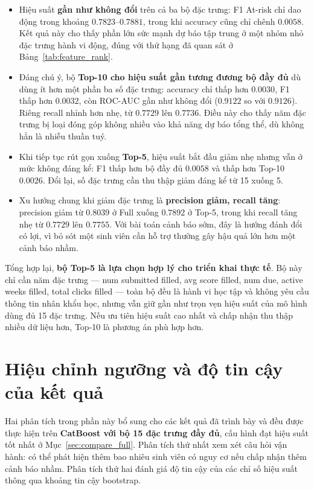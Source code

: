 \documentclass[a4paper]{report}
\newcommand{\code}[1]{{\ttfamily\def\_{\textunderscore\discretionary{}{}{}}#1}}
\def\code#1{#1}%
\def\_{ }%
\begin{document}
\begin{itemize}[leftmargin=*]
  \item Hiệu suất \textbf{gần như không đổi} trên cả ba bộ đặc trưng: F1
        At-risk chỉ dao động trong khoảng $0.7823$--$0.7881$, trong khi accuracy cũng chỉ
        chênh $0.0058$. Kết quả này cho thấy phần lớn sức mạnh dự báo tập trung
        ở một nhóm nhỏ đặc trưng hành vi động, đúng với thứ hạng đã quan sát ở
        Bảng~\ref{tab:feature_rank}.
  \item Đáng chú ý, bộ \textbf{Top-10 cho hiệu suất gần tương đương bộ đầy
        đủ} dù dùng ít hơn một phần ba số đặc trưng: accuracy chỉ thấp hơn
        $0.0030$, F1 thấp hơn $0.0032$, còn ROC-AUC gần như không đổi
        ($0.9122$ so với $0.9126$). Riêng recall nhỉnh hơn nhẹ, từ $0.7729$
        lên $0.7736$. Điều này cho thấy năm đặc trưng bị loại đóng góp không
        nhiều vào khả năng dự báo tổng thể, dù không hẳn là nhiễu thuần tuý.
  \item Khi tiếp tục rút gọn xuống \textbf{Top-5}, hiệu suất bắt đầu giảm nhẹ
        nhưng vẫn ở mức không đáng kể: F1 thấp hơn bộ đầy đủ $0.0058$ và
        thấp hơn Top-10 $0.0026$. Đổi lại, số đặc trưng cần thu thập giảm đáng kể từ
        15 xuống 5.
  \item Xu hướng chung khi giảm đặc trưng là \textbf{precision giảm, recall
        tăng}: precision giảm từ $0.8039$ ở Full xuống $0.7892$ ở Top-5, trong
        khi recall tăng nhẹ từ $0.7729$ lên $0.7755$. Với bài toán cảnh báo
        sớm, đây là hướng đánh đổi có lợi, vì bỏ sót một sinh viên cần hỗ trợ
        thường gây hậu quả lớn hơn một cảnh báo nhầm.
\end{itemize}

Tổng hợp lại, \textbf{bộ Top-5 là lựa chọn hợp lý cho triển khai thực tế}. Bộ
này chỉ cần năm đặc trưng --- \code{num\_submitted\_filled},
\code{avg\_score\_filled}, \code{num\_due}, \code{active\_weeks\_filled},
\code{total\_clicks\_filled} --- toàn bộ đều là hành vi học tập và không yêu
cầu thông tin nhân khẩu học, nhưng vẫn giữ gần như trọn vẹn hiệu suất của mô
hình dùng đủ 15 đặc trưng. Nếu ưu tiên hiệu suất cao nhất và chấp nhận thu
thập nhiều dữ liệu hơn, Top-10 là phương án phù hợp hơn.

\section{Hiệu chỉnh ngưỡng và độ tin cậy của kết quả}
\label{sec:threshold_bootstrap}

Hai phân tích trong phần này bổ sung cho các kết quả đã trình bày và đều được
thực hiện trên \textbf{CatBoost với bộ 15 đặc trưng đầy đủ}, cấu hình đạt hiệu
suất tốt nhất ở Mục~\ref{sec:compare_full}. Phân tích thứ nhất xem xét câu hỏi
vận hành: có thể phát hiện thêm bao nhiêu sinh viên có nguy cơ nếu chấp nhận
thêm cảnh báo nhầm. Phân tích thứ hai đánh giá độ tin cậy của các chỉ số hiệu
suất thông qua khoảng tin cậy bootstrap.
\end{document}
